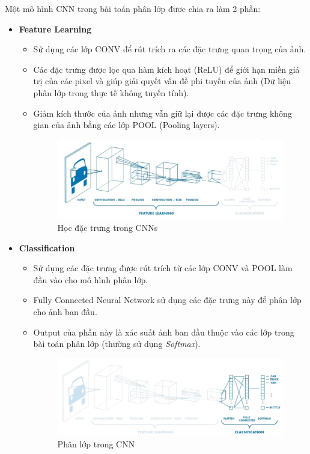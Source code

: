 \documentclass[a4paper, 12pt]{article}
\begin{document}
Một mô hình CNN trong bài toán phân lớp đươc chia ra làm 2 phần:
\begin{itemize}
    \item \textbf{Feature Learning}
    \begin{itemize}
        \item Sử dụng các lớp CONV để rút trích ra các đặc trưng quan trọng của ảnh. 
        \item Các đặc trưng được lọc qua hàm kích hoạt (ReLU) để  giới hạn miền giá trị của các pixel và giúp giải quyết vấn đề phi tuyến của ảnh (Dữ liệu phân lớp trong thực tế không tuyến tính).
        \item Giảm kích thước của ảnh nhưng vẫn giữ lại được các đặc trưng không gian của ảnh bằng các lớp POOL (Pooling layers).
            \begin{figure}[H]
                \begin{center}
                    \includegraphics[scale=0.4]{img/feature-learning-part}
                    \caption{Học đặc trưng trong CNNs}
                \end{center}
            \end{figure}
    \end{itemize}
    \item \textbf{Classification}
    \begin{itemize}
        \item Sử dụng các đặc trưng được rút trích từ các lớp CONV và POOL làm đầu vào cho mô hình phân lớp. 
        \item Fully Connected Neural Network sử dụng các đặc trưng này để phân lớp cho ảnh ban đầu. 
        \item Output của phần này là xác suất ảnh ban đầu thuộc vào các lớp trong bài toán phân lớp (thường sử dụng \textit{Softmax}).
            \begin{figure}[H]
                \begin{center}
                    \includegraphics[scale=0.4]{img/classification-part}
                    \caption{Phân lớp trong CNN}
                \end{center}
            \end{figure}
    \end{itemize}
\end{itemize}
\end{document}
